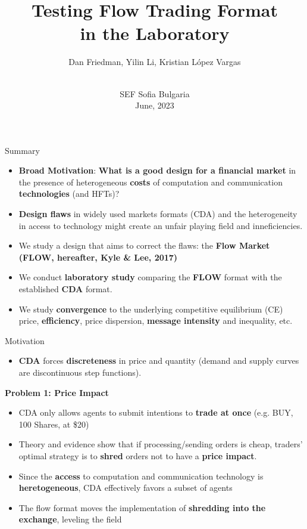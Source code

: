 \documentclass[10pt]{beamer}
\title[Flow Trading]{Testing Flow Trading Format \\in the Laboratory}
\author[YL]{Dan Friedman, Yilin Li, Kristian L\'opez Vargas}
\institute[UCSC]{University of California, Santa Cruz}
\date[June 2023]{\\ SEF Sofia Bulgaria \\ June, 2023}
\begin{document}
\maketitle

\begin{frame}{Summary}
    \begin{itemize}
        \item \textbf{Broad Motivation}: \textbf{What is a good design for a financial market} in the presence of heterogeneous \textbf{costs} of computation and communication \textbf{technologies} (and HFTs)?
        \item \textbf{Design flaws} in widely used markets formats (CDA) and the heterogeneity in access to technology might create an unfair playing field and inneficiencies.
        \vspace{0.5cm}
        \item We study a design that aims to correct the flaws: the \textbf{Flow Market (FLOW, hereafter, Kyle \& Lee, 2017)}
        \item We conduct \textbf{laboratory study} comparing the \textbf{FLOW} format with the established \textbf{CDA} format.
        \item We study \textbf{convergence} to the underlying competitive equilibrium (CE) price, \textbf{efficiency}, {price dispersion}, \textbf{message intensity} and inequality, etc. 
    \end{itemize}
\end{frame}

\begin{frame}{Motivation}
    \begin{itemize}
        \item \textbf{CDA} forces \textbf{discreteness} in price and quantity (demand and supply curves are discontinuous step functions). 
    \end{itemize}
    \textbf{Problem 1: Price Impact} 
    \begin{itemize}
        \item CDA only allows agents to submit intentions to \textbf{trade at once} (e.g. BUY, 100 Shares, at \$20)
        \item Theory and evidence show that if processing/sending orders is cheap, traders' optimal strategy is to \textbf{shred} orders not to have a \textbf{price impact}.
        \item Since the \textbf{access} to computation and communication technology is \textbf{heretogeneous}, CDA effectively favors a subset of agents
        \item The flow format moves the implementation of \textbf{shredding into the exchange}, leveling the field
    \end{itemize}
\end{frame}
\end{document}
